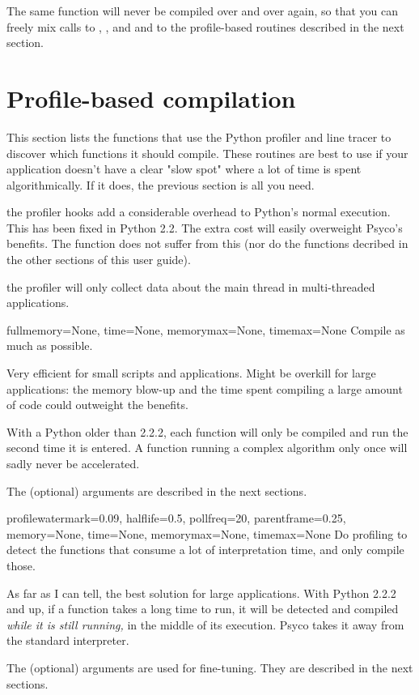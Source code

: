 \documentclass{manual}
\begin{document}
The same function will never be compiled over and over again, so that you can freely mix calls to , ,  and  and to the profile-based routines described in the next section.


\section{Profile-based compilation}

This section lists the functions that use the Python profiler and line tracer to discover which functions it should compile.  These routines are best to use if your application doesn't have a clear "slow spot" where a lot of time is spent algorithmically.  If it does, the previous section is all you need.

 the profiler hooks add a considerable overhead to Python's normal execution.  This has been fixed in Python 2.2.  The extra cost will easily overweight Psyco's benefits.  The function  does not suffer from this (nor do the functions decribed in the other sections of this user guide).

 the profiler will only collect data about the main thread in multi-threaded applications.

\begin{funcdesc}{full}{memory=None, time=None, memorymax=None, timemax=None}
  Compile as much as possible.

  Very efficient for small scripts and applications.  Might be overkill for large applications: the memory blow-up and the time spent compiling a large amount of code could outweight the benefits.

  With a Python older than 2.2.2, each function will only be compiled and run the second time it is entered.  A function running a complex algorithm only once will sadly never be accelerated.

  The (optional) arguments are described in the next sections.
\end{funcdesc}

\begin{funcdesc}{profile}{watermark=0.09, halflife=0.5, pollfreq=20, parentframe=0.25, memory=None, time=None, memorymax=None, timemax=None}
  Do profiling to detect the functions that consume a lot of interpretation time, and only compile those.

  As far as I can tell, the best solution for large applications.  With Python 2.2.2 and up, if a function takes a long time to run, it will be detected and compiled \emph{while it is still running,} in the middle of its execution.  Psyco takes it away from the standard interpreter.

  The (optional) arguments are used for fine-tuning.  They are described in the next sections.
\end{funcdesc}
\end{document}
